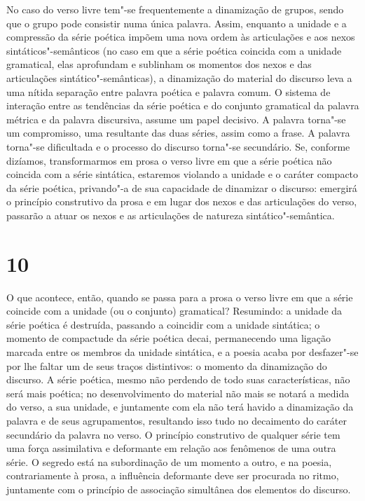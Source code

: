 No caso do verso livre tem"-se frequentemente a dinamização de grupos,
sendo que o grupo pode consistir numa única palavra. Assim, enquanto a
unidade e a compressão da série poética impõem uma nova ordem às
articulações e aos nexos sintáticos"-semânticos (no caso em que a
série poética coincida com a unidade gramatical, elas aprofundam e
sublinham os momentos dos nexos e das articulações sintático"-semânticas), a dinamização do material do discurso leva a uma nítida
separação entre palavra poética e palavra comum. O sistema de interação
entre as tendências da série poética e do conjunto gramatical da palavra
métrica e da palavra discursiva, assume um papel decisivo. A palavra
torna"-se um compromisso, uma resultante das duas séries, assim como a
frase. A palavra torna"-se dificultada e o processo do discurso torna"-se
secundário. Se, conforme dizíamos, transformarmos em prosa o verso livre
em que a série poética não coincida com a série sintática, estaremos
violando a unidade e o caráter compacto da série poética, privando"-a de
sua capacidade de dinamizar o discurso: emergirá o princípio construtivo
da prosa e em lugar dos nexos e das articulações do verso, passarão a
atuar os nexos e as articulações de natureza sintático"-semântica.

\section{10}

O que acontece, então, quando se passa para a prosa o verso livre
em que a série coincide com a unidade (ou o conjunto) gramatical? Resumindo: a
unidade da série poética é destruída, passando a coincidir com a unidade
sintática; o momento de compactude da série poética decai, permanecendo
uma ligação marcada entre os membros da unidade sintática, e a poesia
acaba por desfazer"-se por lhe faltar um de seus traços distintivos: o
momento da dinamização do discurso. A série poética, mesmo não perdendo
de todo suas características, não será mais poética; no desenvolvimento
do material não mais se notará a medida do verso, a sua unidade, e
juntamente com ela não terá havido a dinamização da palavra e de seus
agrupamentos, resultando isso tudo no decaimento do caráter secundário
da palavra no verso. O princípio construtivo de qualquer série tem uma
força assimilativa e deformante em relação aos fenômenos de uma outra
série. O segredo está na subordinação de um momento a outro, e na
poesia, contrariamente à prosa, a influência deformante deve ser
procurada no ritmo, juntamente com o princípio de associação simultânea
dos elementos do discurso.

